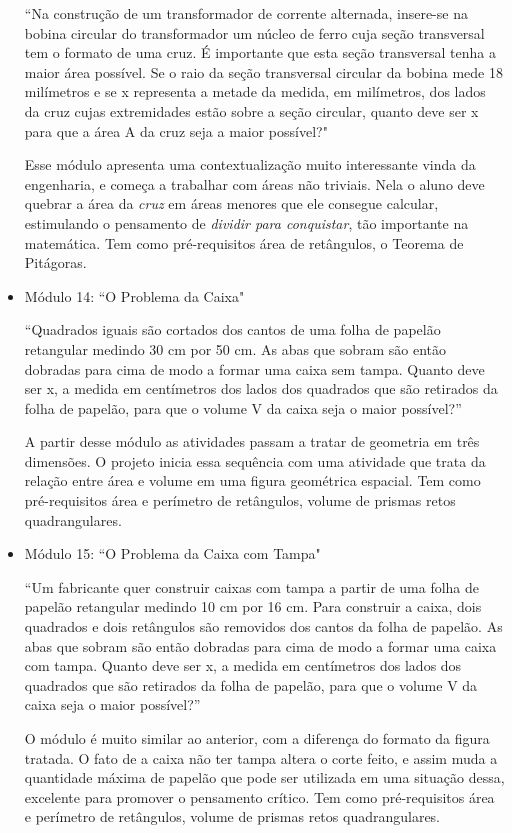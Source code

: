 \begin{itemize}
    ``Na construção de um transformador de corrente alternada, insere-se na bobina circular do transformador um núcleo de ferro cuja seção transversal tem o formato de uma cruz. É importante que esta seção transversal tenha a maior área possível. Se o raio da seção transversal circular da bobina mede 18 milímetros e se x representa a metade da medida, em milímetros, dos lados da cruz cujas extremidades estão sobre a seção circular, quanto deve ser x para que a área A da cruz seja a maior possível?"

    Esse módulo apresenta uma contextualização muito interessante vinda da engenharia, e começa a trabalhar com áreas não triviais. Nela o aluno deve quebrar a área da \textit{cruz} em áreas menores que ele consegue calcular, estimulando o pensamento de \textit{dividir para conquistar}, tão importante na matemática. Tem como pré-requisitos área de retângulos, o Teorema de Pitágoras.
    
    \item Módulo 14: ``O Problema da Caixa"
    
    ``Quadrados iguais são cortados dos cantos de uma folha de papelão retangular medindo 30 cm por 50 cm. As abas que sobram são então dobradas para cima de modo a formar uma caixa sem tampa. Quanto deve ser x, a medida em centímetros dos lados dos quadrados que são retirados da folha de papelão, para que o volume V da caixa seja o maior possível?”
    
    A partir desse módulo as atividades passam a tratar de geometria em três dimensões. O projeto inicia essa sequência com uma atividade que trata da relação entre área e volume em uma figura geométrica espacial. Tem como pré-requisitos área e perímetro de retângulos, volume de prismas retos quadrangulares.
    
    \item Módulo 15: ``O Problema da Caixa com Tampa"
    
    ``Um fabricante quer construir caixas com tampa a partir de uma folha de papelão retangular medindo 10 cm por 16 cm. Para construir a caixa, dois quadrados e dois retângulos são removidos dos cantos da folha de papelão. As abas que sobram são então dobradas para cima de modo a formar uma caixa com tampa. Quanto deve ser x, a medida em centímetros dos lados dos quadrados que são retirados da folha de papelão, para que o volume V da caixa seja o maior possível?”
    
    O módulo é muito similar ao anterior, com a diferença do formato da figura tratada. O fato de a caixa não ter tampa altera o corte feito, e assim muda a quantidade máxima de papelão que pode ser utilizada em uma situação dessa, excelente para promover o pensamento crítico. Tem como pré-requisitos área e perímetro de retângulos, volume de prismas retos quadrangulares.
    

\end{itemize}
